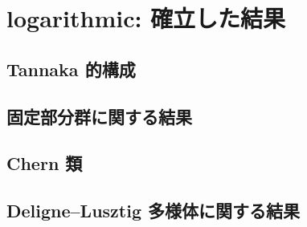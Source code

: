 
\section{logarithmic: 確立した結果}

\subsection{Tannaka 的構成}

\subsection{固定部分群に関する結果}

\subsection{Chern 類}

\subsection{Deligne--Lusztig 多様体に関する結果}
